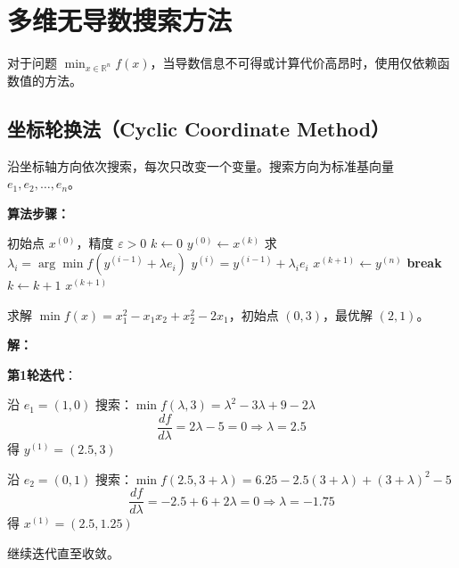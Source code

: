 

\section{多维无导数搜索方法}\label{sec:derivative-free}

对于问题 $\min_{x \in \mathbb{R}^n} f(x)$，当导数信息不可得或计算代价高昂时，使用仅依赖函数值的方法。

\subsection{坐标轮换法（Cyclic Coordinate Method）}\label{sec:cyclic}

\begin{conceptbox}[基本思想]
沿坐标轴方向依次搜索，每次只改变一个变量。搜索方向为标准基向量 $e_1, e_2, \ldots, e_n$。
\end{conceptbox}

\textbf{算法步骤：}
\begin{algorithm}[H]
\caption{坐标轮换法}
\begin{algorithmic}[1]
\Require 初始点 $x^{(0)}$，精度 $\varepsilon > 0$
\State $k \gets 0$
    \State $y^{(0)} \gets x^{(k)}$
        \State 求 $\lambda_i = \arg\min f(y^{(i-1)} + \lambda e_i)$
        \State $y^{(i)} = y^{(i-1)} + \lambda_i e_i$
    \EndFor
    \State $x^{(k+1)} \gets y^{(n)}$
        \State \textbf{break}
    \EndIf
    \State $k \gets k + 1$
\EndWhile
\State \Return $x^{(k+1)}$
\end{algorithmic}
\end{algorithm}

\begin{example}[坐标轮换法]
求解 $\min f(x) = x_1^2 - x_1 x_2 + x_2^2 - 2x_1$，初始点 $(0, 3)$，最优解 $(2, 1)$。

\textbf{解：}

\textbf{第1轮迭代}：

沿 $e_1 = (1, 0)$ 搜索：$\min f(\lambda, 3) = \lambda^2 - 3\lambda + 9 - 2\lambda$
\[
\frac{df}{d\lambda} = 2\lambda - 5 = 0 \Rightarrow \lambda = 2.5
\]
得 $y^{(1)} = (2.5, 3)$

沿 $e_2 = (0, 1)$ 搜索：$\min f(2.5, 3 + \lambda) = 6.25 - 2.5(3+\lambda) + (3+\lambda)^2 - 5$
\[
\frac{df}{d\lambda} = -2.5 + 6 + 2\lambda = 0 \Rightarrow \lambda = -1.75
\]
得 $x^{(1)} = (2.5, 1.25)$

继续迭代直至收敛。
\end{example}

